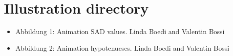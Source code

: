 \documentclass[12pt, a4paper]{report}
\begin{document}
\pagebreak

\section {Illustration directory}
\bigskip

\begin{itemize}
\item Abbildung 1: Animation SAD values. Linda Boedi and Valentin Bossi
\item Abbildung 2: Animation hypotenueses. Linda Boedi and Valentin Bossi
\end{itemize}
\end{document}
